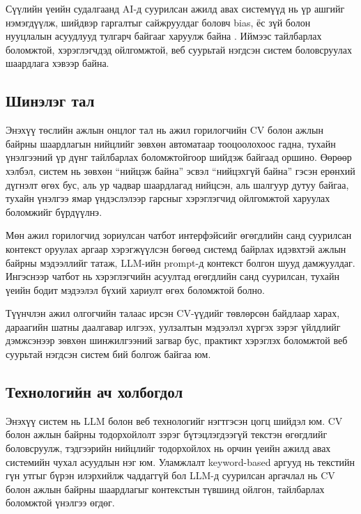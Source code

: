 Сүүлийн үеийн судалгаанд AI-д суурилсан ажилд авах системүүд нь үр ашгийг нэмэгдүүлж, шийдвэр гаргалтыг сайжруулдаг боловч bias, ёс зүй болон нууцлалын асуудлууд тулгарч байгааг харуулж байна . Иймээс тайлбарлах боломжтой, хэрэглэгчдэд ойлгомжтой, веб суурьтай нэгдсэн систем боловсруулах шаардлага хэвээр байна.
\subsection*{Шинэлэг тал}

\par{}Энэхүү төслийн ажлын онцлог тал нь ажил горилогчийн CV болон ажлын байрны шаардлагын нийцлийг зөвхөн автоматаар тооцоолохоос гадна, тухайн үнэлгээний үр дүнг тайлбарлах боломжтойгоор шийдэж байгаад оршино. Өөрөөр хэлбэл, систем нь зөвхөн ``нийцэж байна'' эсвэл ``нийцэхгүй байна'' гэсэн ерөнхий дүгнэлт өгөх бус, аль ур чадвар шаардлагад нийцсэн, аль шалгуур дутуу байгаа, тухайн үнэлгээ ямар үндэслэлээр гарсныг хэрэглэгчид ойлгомжтой харуулах боломжийг бүрдүүлнэ.

\par{}Мөн ажил горилогчид зориулсан чатбот интерфэйсийг өгөгдлийн санд суурилсан контекст оруулах аргаар хэрэгжүүлсэн бөгөөд системд байрлах идэвхтэй ажлын байрны мэдээллийг татаж, LLM-ийн prompt-д контекст болгон шууд дамжуулдаг. Ингэснээр чатбот нь хэрэглэгчийн асуултад өгөгдлийн санд суурилсан, тухайн үеийн бодит мэдээлэл бүхий хариулт өгөх боломжтой болно.

\par{}Түүнчлэн ажил олгогчийн талаас ирсэн CV-үүдийг төвлөрсөн байдлаар харах, дараагийн шатны даалгавар илгээх, уулзалтын мэдээлэл хүргэх зэрэг үйлдлийг дэмжсэнээр зөвхөн шинжилгээний загвар бус, практикт хэрэглэх боломжтой веб суурьтай нэгдсэн систем бий болгож байгаа юм.
 
\subsection*{Технологийн ач холбогдол}

\par{}Энэхүү систем нь LLM болон веб технологийг нэгтгэсэн цогц шийдэл юм. CV болон ажлын байрны тодорхойлолт зэрэг бүтэцлэгдээгүй текстэн өгөгдлийг боловсруулж, тэдгээрийн нийцлийг тодорхойлох нь орчин үеийн ажилд авах системийн чухал асуудлын нэг юм. Уламжлалт keyword-based аргууд нь текстийн гүн утгыг бүрэн илэрхийлж чаддаггүй бол LLM-д суурилсан аргачлал нь CV болон ажлын байрны шаардлагыг контекстын түвшинд ойлгон, тайлбарлах боломжтой үнэлгээ өгдөг.

